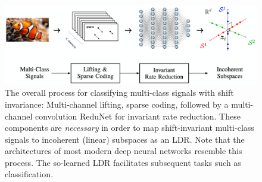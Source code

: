 \documentclass[../../book-main.tex]{subfiles}
\begin{document}
\begin{figure}[t]
    \centering
    \includegraphics[width=0.98\linewidth]{figs_chap4/learn_to_classify_diagram_updated.png}
    \caption{The overall process for classifying multi-class signals with shift invariance: Multi-channel lifting,  sparse coding, followed by a multi-channel convolution ReduNet for invariant rate reduction. These components are {\em necessary} in order to map shift-invariant multi-class signals to incoherent (linear) subspaces as an LDR. Note that the architectures of most modern deep neural networks resemble this process. The so-learned LDR facilitates subsequent tasks such as classification.}
    \label{fig:learn-to-classify-diagram}
\end{figure}

\end{document}
